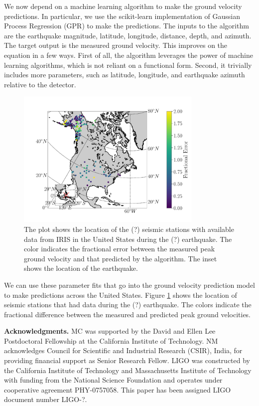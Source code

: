 \documentclass[preprint, aps, showpacs]{revtex4-1}
\newcommand{\rednote}[1]{{\color{red} (#1)}}
\begin{document}
We now depend on a machine learning algorithm to make the ground velocity predictions. In particular, we use the scikit-learn implementation of Gaussian Process Regression (GPR) to make the predictions.
The inputs to the algorithm are the earthquake magnitude, latitude, longitude, distance, depth, and azimuth. 
The target output is the measured ground velocity.
This improves on the equation in a few ways.
First of all, the algorithm leverages the power of machine learning algorithms, which is not reliant on a functional form.
Second, it trivially includes more parameters, such as latitude, longitude, and earthquake azimuth relative to the detector.

\begin{figure}[t]
\hspace*{-0.5cm}
 \includegraphics[width=3.5in,trim = 2.5cm 1.5cm 2.5cm 1.5cm, clip=true]{maps_vel_pred_vs_measured.pdf}
 \caption{The plot shows the location of the \rednote{?} seismic stations with available data from IRIS in the United States during the \rednote{?} earthquake. The color indicates the fractional error between the measured peak ground velocity and that predicted by the algorithm. The inset shows the location of the earthquake.}
 \label{fig:map}
\end{figure}

We can use these parameter fits that go into the ground velocity prediction model to make predictions across the United States.
Figure \ref{fig:map} shows the location of seismic stations that had data during the \rednote{?} earthquake. The colors indicate the fractional difference between the measured and predicted peak ground velocities.  

\textbf{Acknowledgments.}
MC was supported by the David and Ellen Lee Postdoctoral Fellowship at the California Institute of Technology.
NM acknowledges Council for Scientific and Industrial Research (CSIR), India, for providing financial support as Senior Research Fellow.  
LIGO was constructed by the California Institute of Technology and Massachusetts Institute of Technology with funding from the National Science Foundation and operates under cooperative agreement PHY-0757058.
This paper has been assigned LIGO document number LIGO-?.
\end{document}
